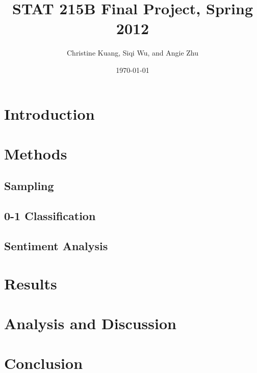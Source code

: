 \documentclass[11pt]{article}
\title{STAT 215B Final Project, Spring 2012}
\author{Christine Kuang, Siqi Wu, and Angie Zhu}
\date{\today} %
\newcommand{\1}[1]{{\mathbf 1}\left\{#1\right\}}        %
\begin{document}
\setlength\footskip{0.5in}


\lstset{
showspaces=false, 
language=R, 
basicstyle=\ttfamily, 
tabsize=3, 
showstringspaces=false, 
columns=flexible%
}

\maketitle

\section{Introduction}


\section{Methods}

\subsection{Sampling}

\subsection{0-1 Classification}

\subsection{Sentiment Analysis}



\section{Results}

\section{Analysis and Discussion}

\section{Conclusion}



%


%
%




%
\end{document}
